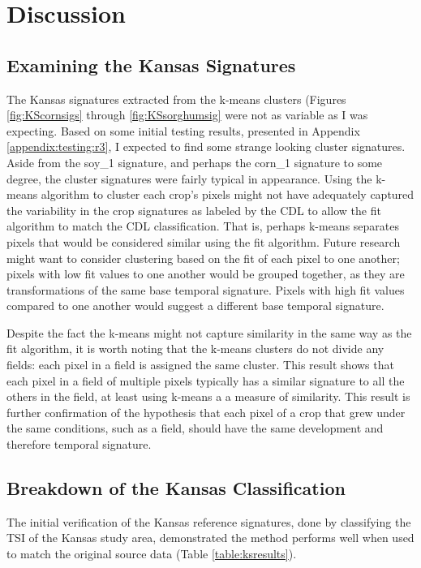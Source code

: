 \chapter{Discussion}

\section{Examining the Kansas Signatures}

The Kansas signatures extracted from the k-means clusters (Figures \ref{fig:KScornsigs} through \ref{fig:KSsorghumsig} were not as variable as I was expecting. Based on some initial testing results, presented in Appendix \ref{appendix:testing:r3}, I expected to find some strange looking cluster signatures. Aside from the soy\_1 signature, and perhaps the corn\_1 signature to some degree, the cluster signatures were fairly typical in appearance. Using the k-means algorithm to cluster each crop's pixels might not have adequately captured the variability in the crop signatures as labeled by the CDL to allow the fit algorithm to match the CDL classification. That is, perhaps k-means separates pixels that would be considered similar using the fit algorithm. Future research might want to consider clustering based on the fit of each pixel to one another; pixels with low fit values to one another would be grouped together, as they are transformations of the same base temporal signature. Pixels with high fit values compared to one another would suggest a different base temporal signature.

Despite the fact the k-means might not capture similarity in the same way as the fit algorithm, it is worth noting that the k-means clusters do not divide any fields: each pixel in a field is assigned the same cluster. This result shows that each pixel in a field of multiple pixels typically has a similar signature to all the others in the field, at least using k-means a a measure of similarity. This result is further confirmation of the hypothesis that each pixel of a crop that grew under the same conditions, such as a field, should have the same development and therefore temporal signature.

\section{Breakdown of the Kansas Classification}

The initial verification of the Kansas reference signatures, done by classifying the TSI of the Kansas study area, demonstrated the method performs well when used to match the original source data (Table \ref{table:ksresults}).

